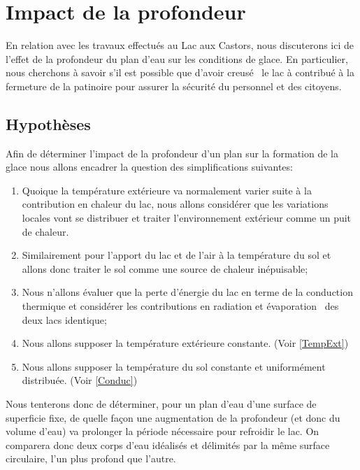 \documentclass[12pt]{article}
\begin{document}
\section{Impact de la profondeur}

En relation avec les travaux effectu\'es au Lac aux Castors, nous discuterons ici de l'effet de la
profondeur du plan d'eau sur les conditions de glace. En particulier, nous cherchons \`a savoir s'il est
possible que d'avoir creus\'e~\cite{Lac} le lac \`a contribu\'e \`a la fermeture de la patinoire pour
assurer la s\'ecurit\'e du personnel et des citoyens.

\subsection{Hypoth\`eses}

Afin de d\'eterminer l'impact de la profondeur d'un plan sur la formation de la glace nous allons
encadrer la question des simplifications suivantes:

\begin{enumerate}
    \item Quoique la temp\'erature ext\'erieure va normalement varier suite \`a la contribution
        en chaleur du lac, nous allons consid\'erer que les variations locales vont se distribuer
        et traiter l'environnement ext\'erieur comme un puit de chaleur.
    \item Similairement pour l'apport du lac et de l'air \`a la temp\'erature du sol et allons
        donc traiter le sol comme une source de chaleur in\'epuisable;
    \item Nous n'allons \'evaluer que la perte d'\'energie du lac en terme de la conduction thermique
        et consid\'erer les contributions en radiation et \'evaporation~\cite{Evap} des deux lacs
        identique;
    \item Nous allons supposer la temp\'erature ext\'erieure constante. (Voir \ref{TempExt})
    \item Nous allons supposer la temp\'erature du sol constante et uniform\'ement distribu\'ee.
        (Voir \ref{Conduc})
\end{enumerate}

Nous tenterons donc de d\'eterminer, pour un plan d'eau d'une surface de superficie fixe, de quelle fa\c
con une augmentation de la profondeur (et donc du volume d'eau) va prolonger la p\'eriode n\'ecessaire
pour refroidir le lac. On comparera donc deux corps d'eau id\'ealis\'es et d\'elimit\'es par la m\^eme
surface circulaire, l'un plus profond que l'autre.
\end{document}
